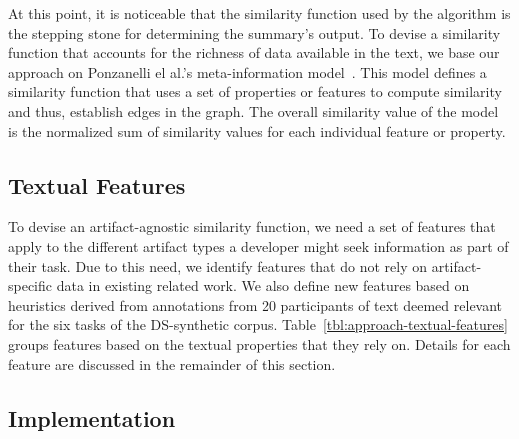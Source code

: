 At this point, it is noticeable that the similarity function used by the algorithm 
is the stepping stone for determining the summary's output.  
To devise a similarity function that accounts for the richness of data available in the 
text, we base our approach on Ponzanelli el al.'s meta-information model~\cite{Ponzanelli2015}.
This model 
defines a similarity function that uses a set of properties 
or features to compute similarity and thus, establish edges in the graph.
The overall similarity value of the model is the 
normalized sum of similarity values for each individual feature or property.



\subsection{Textual Features}



To devise an artifact-agnostic similarity function, we need a set of features that apply to the different artifact types a developer might seek information as part of their task.
Due to this need, we identify features that do not rely on artifact-specific data in existing related work. 
We also define new features based 
on heuristics derived from annotations from 20 participants of text deemed relevant
for the six tasks of the \acs{DS-synthetic} corpus.
Table~\ref{tbl:approach-textual-features} groups features based on the textual properties that they rely on. Details for each feature are discussed in the remainder of this section.








\subsection{Implementation}








